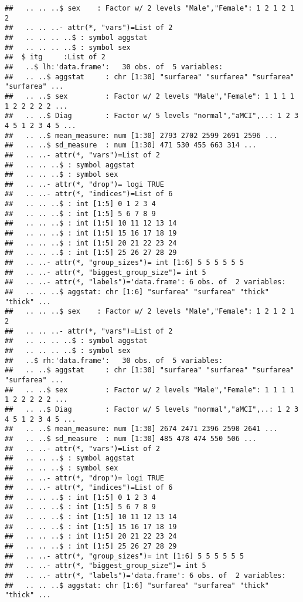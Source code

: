 \documentclass[12pt]{article}
\begin{document}
\begin{knitrout}
\begin{kframe}
\begin{verbatim}
##   .. .. ..$ sex    : Factor w/ 2 levels "Male","Female": 1 2 1 2 1 2
##   .. .. ..- attr(*, "vars")=List of 2
##   .. .. .. ..$ : symbol aggstat
##   .. .. .. ..$ : symbol sex
##  $ itg     :List of 2
##   ..$ lh:'data.frame':	30 obs. of  5 variables:
##   .. ..$ aggstat     : chr [1:30] "surfarea" "surfarea" "surfarea" "surfarea" ...
##   .. ..$ sex         : Factor w/ 2 levels "Male","Female": 1 1 1 1 1 2 2 2 2 2 ...
##   .. ..$ Diag        : Factor w/ 5 levels "normal","aMCI",..: 1 2 3 4 5 1 2 3 4 5 ...
##   .. ..$ mean_measure: num [1:30] 2793 2702 2599 2691 2596 ...
##   .. ..$ sd_measure  : num [1:30] 471 530 455 663 314 ...
##   .. ..- attr(*, "vars")=List of 2
##   .. .. ..$ : symbol aggstat
##   .. .. ..$ : symbol sex
##   .. ..- attr(*, "drop")= logi TRUE
##   .. ..- attr(*, "indices")=List of 6
##   .. .. ..$ : int [1:5] 0 1 2 3 4
##   .. .. ..$ : int [1:5] 5 6 7 8 9
##   .. .. ..$ : int [1:5] 10 11 12 13 14
##   .. .. ..$ : int [1:5] 15 16 17 18 19
##   .. .. ..$ : int [1:5] 20 21 22 23 24
##   .. .. ..$ : int [1:5] 25 26 27 28 29
##   .. ..- attr(*, "group_sizes")= int [1:6] 5 5 5 5 5 5
##   .. ..- attr(*, "biggest_group_size")= int 5
##   .. ..- attr(*, "labels")='data.frame':	6 obs. of  2 variables:
##   .. .. ..$ aggstat: chr [1:6] "surfarea" "surfarea" "thick" "thick" ...
##   .. .. ..$ sex    : Factor w/ 2 levels "Male","Female": 1 2 1 2 1 2
##   .. .. ..- attr(*, "vars")=List of 2
##   .. .. .. ..$ : symbol aggstat
##   .. .. .. ..$ : symbol sex
##   ..$ rh:'data.frame':	30 obs. of  5 variables:
##   .. ..$ aggstat     : chr [1:30] "surfarea" "surfarea" "surfarea" "surfarea" ...
##   .. ..$ sex         : Factor w/ 2 levels "Male","Female": 1 1 1 1 1 2 2 2 2 2 ...
##   .. ..$ Diag        : Factor w/ 5 levels "normal","aMCI",..: 1 2 3 4 5 1 2 3 4 5 ...
##   .. ..$ mean_measure: num [1:30] 2674 2471 2396 2590 2641 ...
##   .. ..$ sd_measure  : num [1:30] 485 478 474 550 506 ...
##   .. ..- attr(*, "vars")=List of 2
##   .. .. ..$ : symbol aggstat
##   .. .. ..$ : symbol sex
##   .. ..- attr(*, "drop")= logi TRUE
##   .. ..- attr(*, "indices")=List of 6
##   .. .. ..$ : int [1:5] 0 1 2 3 4
##   .. .. ..$ : int [1:5] 5 6 7 8 9
##   .. .. ..$ : int [1:5] 10 11 12 13 14
##   .. .. ..$ : int [1:5] 15 16 17 18 19
##   .. .. ..$ : int [1:5] 20 21 22 23 24
##   .. .. ..$ : int [1:5] 25 26 27 28 29
##   .. ..- attr(*, "group_sizes")= int [1:6] 5 5 5 5 5 5
##   .. ..- attr(*, "biggest_group_size")= int 5
##   .. ..- attr(*, "labels")='data.frame':	6 obs. of  2 variables:
##   .. .. ..$ aggstat: chr [1:6] "surfarea" "surfarea" "thick" "thick" ...

\end{verbatim}
\end{kframe}
\end{knitrout}
\end{document}
